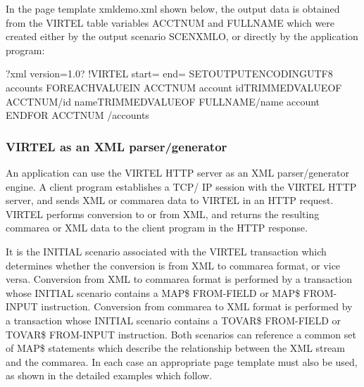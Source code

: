 \documentclass[letterpaper,10pt,english]{sphinxmanual}
\begin{document}
In the page template xmldemo.xml shown below, the output data is obtained from the VIRTEL table variables
ACCTNUM and FULLNAME which were created either by the output scenario SCENXMLO, or directly by the application
program:

\begin{sphinxVerbatim}[commandchars=\\\{\}]
\PYGZlt{}?xml version=\PYGZdq{}1.0\PYGZdq{}?\PYGZgt{}
\PYGZlt{}!\PYGZhy{}\PYGZhy{}VIRTEL start=\PYGZdq{}\PYGZob{}\PYGZob{}\PYGZob{}\PYGZdq{} end=\PYGZdq{}\PYGZcb{}\PYGZcb{}\PYGZcb{}\PYGZdq{} \PYGZhy{}\PYGZhy{}\PYGZgt{}
\PYGZob{}\PYGZob{}\PYGZob{}SET\PYGZhy{}OUTPUT\PYGZhy{}ENCODING\PYGZhy{}UTF\PYGZhy{}8 \PYGZdq{}\PYGZdq{}\PYGZcb{}\PYGZcb{}\PYGZcb{}
\PYGZlt{}accounts\PYGZgt{}
\PYGZob{}\PYGZob{}\PYGZob{}FOR\PYGZhy{}EACH\PYGZhy{}VALUE\PYGZhy{}IN \PYGZdq{}ACCTNUM\PYGZdq{}\PYGZcb{}\PYGZcb{}\PYGZcb{}
    \PYGZlt{}account\PYGZgt{}
        \PYGZlt{}id\PYGZgt{}\PYGZob{}\PYGZob{}\PYGZob{}TRIMMED\PYGZhy{}VALUE\PYGZhy{}OF \PYGZdq{}ACCTNUM\PYGZdq{}\PYGZcb{}\PYGZcb{}\PYGZcb{}\PYGZlt{}/id\PYGZgt{}
        \PYGZlt{}name\PYGZgt{}\PYGZob{}\PYGZob{}\PYGZob{}TRIMMED\PYGZhy{}VALUE\PYGZhy{}OF \PYGZdq{}FULLNAME\PYGZdq{}\PYGZcb{}\PYGZcb{}\PYGZcb{}\PYGZlt{}/name\PYGZgt{}
    \PYGZlt{}account\PYGZgt{}
\PYGZob{}\PYGZob{}\PYGZob{}END\PYGZhy{}FOR \PYGZdq{}ACCTNUM\PYGZdq{}\PYGZcb{}\PYGZcb{}\PYGZcb{}
\PYGZlt{}/accounts\PYGZgt{}
\end{sphinxVerbatim}



\subsubsection{VIRTEL as an XML parser/generator}
\label{\detokenize{User_Guide:virtel-as-an-xml-parser-generator}}\label{\detokenize{User_Guide:v457ug-xml-parser}}
An application can use the VIRTEL HTTP server as an XML parser/generator engine. A client program establishes a TCP/
IP session with the VIRTEL HTTP server, and sends XML or commarea data to VIRTEL in an HTTP request. VIRTEL
performs conversion to or from XML, and returns the resulting commarea or XML data to the client program in the
HTTP response.

It is the INITIAL scenario associated with the VIRTEL transaction which determines whether the conversion is from XML
to commarea format, or vice versa. Conversion from XML to commarea format is performed by a transaction whose
INITIAL scenario contains a MAP\$ FROM-FIELD or MAP\$ FROM-INPUT instruction. Conversion from commarea to XML
format is performed by a transaction whose INITIAL scenario contains a TOVAR\$ FROM-FIELD or TOVAR\$ FROM-INPUT
instruction. Both scenarios can reference a common set of MAP\$ statements which describe the relationship between
the XML stream and the commarea. In each case an appropriate page template must also be used, as shown in the
detailed examples which follow.
\end{document}
